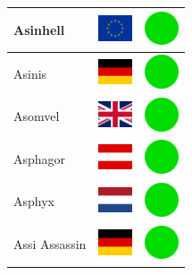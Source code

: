 \documentclass[12pt, a4paper, twoside]{report}
\begin{document}
\begin{center}
\begin{longtable}{|p{5cm}|p{2cm}|p{2cm}|}
 Asinhell                                                   & \includegraphics[width=1cm]{../4x3/eu} &   \includegraphics[width=1cm]{../likes/y} \\ \hline
 Asinis                                                     & \includegraphics[width=1cm]{../4x3/de} &   \includegraphics[width=1cm]{../likes/y} \\ \hline
 Asomvel                                                    & \includegraphics[width=1cm]{../4x3/gb} &   \includegraphics[width=1cm]{../likes/y} \\ \hline
 Asphagor                                                   & \includegraphics[width=1cm]{../4x3/at} &   \includegraphics[width=1cm]{../likes/y} \\ \hline
 Asphyx                                                     & \includegraphics[width=1cm]{../4x3/nl} &   \includegraphics[width=1cm]{../likes/y} \\ \hline
 Assi Assassin                                              & \includegraphics[width=1cm]{../4x3/de} &   \includegraphics[width=1cm]{../likes/y} \\ \hline

\end{longtable}
\end{center}
\end{document}
